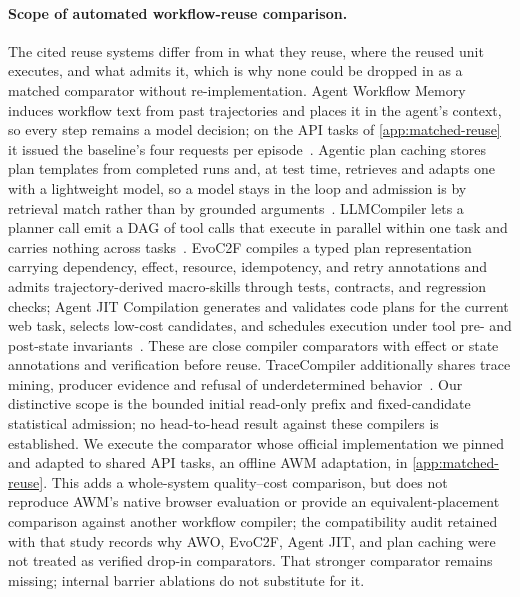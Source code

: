 \begin{table}[t]
  \centering
  \caption{Structural dispatch eligibility before and after admitting an exact
  read-only prologue (the API-documentation call these architectures open
  with), per released AppWorld baseline architecture; never pooled. The
  runtime rule and the measurement rule are the same function.}
  \label{tab:appworld-prologue}
  \scriptsize
  \setlength{\tabcolsep}{3pt}
  
\end{table}

\paragraph{Scope of automated workflow-reuse comparison.}
The cited reuse systems differ from \method in what they reuse, where the
reused unit executes, and what admits it, which is why none could be dropped in
as a matched comparator without re-implementation. Agent Workflow Memory
induces workflow text from past trajectories and places it in the agent's
context, so every step remains a model decision; on the API tasks of
\cref{app:matched-reuse} it issued the baseline's four requests per
episode~\citep{wang2025awm}. Agentic plan caching stores plan templates from
completed runs and, at test time, retrieves and adapts one with a lightweight
model, so a model stays in the loop and admission is by retrieval match rather
than by grounded arguments~\citep{zhang2025plancache}. LLMCompiler lets a
planner call emit a DAG of tool calls that execute in parallel within one task
and carries nothing across tasks~\citep{kim2024llmcompiler}. EvoC2F compiles a
typed plan representation carrying dependency, effect, resource, idempotency,
and retry annotations and admits trajectory-derived macro-skills through tests,
contracts, and regression checks; Agent JIT Compilation generates and validates
code plans for the current web task, selects low-cost candidates, and schedules
execution under tool pre- and post-state
invariants~\citep{wei2026evoc2f,winston2026agentjit}. These are close compiler
comparators with effect or state annotations and verification before reuse.
TraceCompiler additionally shares trace mining, producer evidence and refusal
of underdetermined behavior~\citep{elyadouni2026tracecompiler}. Our distinctive
scope is the bounded initial read-only prefix and fixed-candidate statistical
admission; no head-to-head result against these compilers is established.
We execute the
comparator whose official implementation we pinned and adapted to shared API
tasks, an offline AWM adaptation, in \cref{app:matched-reuse}. This adds a
whole-system quality--cost comparison, but does not reproduce AWM's native
browser evaluation or provide an equivalent-placement comparison against
another workflow compiler; the compatibility audit retained with that study
records why AWO, EvoC2F, Agent JIT, and plan caching were not treated as
verified drop-in comparators. That stronger comparator remains missing;
internal barrier ablations do not substitute for it.

